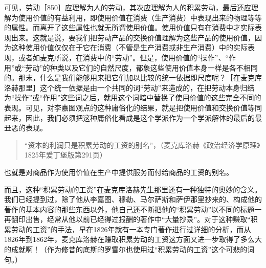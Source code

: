 可见，劳动［850］应理解为人的劳动，其次应理解为人的积累劳动，最后还应理解为使用价值的有益利用，即使用价值在消费（生产消费）中表现出来的物理等等的属性。而离开了这些属性也就无所谓使用价值。使用价值只有在消费中才实际表现出来。这就是说，要我们把劳动产品的交换价值理解为这些产品的使用价值，因为这种使用价值仅仅在于它在消费（不管是生产消费或非生产消费）中的实际表现，或者如麦克所说，在消费中的“劳动”。但是，使用价值的“操作”、“作用”或“劳动”的种类以及它们的自然尺度，都象这些使用价值本身一样是各不相同的。那末，什么是我们能够用来把它们加以比较的统一依据即尺度呢？［在麦克库洛赫那里］这个统一依据是由一个共同的词“劳动”来造成的，在把劳动本身归结为“操作”或“作用”这些词之后，就用这个词暗中替换了使用价值的这些完全不同的表现。可见，对李嘉图观点的这种庸俗化的结果，就是把使用价值和交换价值等同起来，因此，我们必须把这种庸俗化看成是这个学派作为一个学派解体的最后的最丑恶的表现。

\begin{quote}{“资本的利润只是积累劳动的工资的别名”，（麦克库洛赫《政治经济学原理》1825年爱丁堡版第291页）}\end{quote}

也就是对商品作为使用价值在生产中提供服务而付给商品的工资的别名。

而且，这种“积累劳动的工资”在麦克库洛赫先生那里还有一种独特的奥妙的含义。我们已经提到过，除了他从李嘉图、穆勒、马尔萨斯和萨伊那里抄来的、构成他的著作的基本内容的那些东西以外，他自己还不断把他的“积累劳动”以不同的标题一再翻印出售，经常从他以前已经得过报酬的著作中“大量抄录”。对于这种赚取“积累劳动的工资”的手法，早在1826年就有一本专门著作进行过详细的分析，而从1826年到1862年，麦克库洛赫在赚取积累劳动的工资这方面又进一步取得了多么大的成就啊！（作为修昔的底斯的罗雪尔也使用过“积累劳动的工资”这个可悲的词句。）

